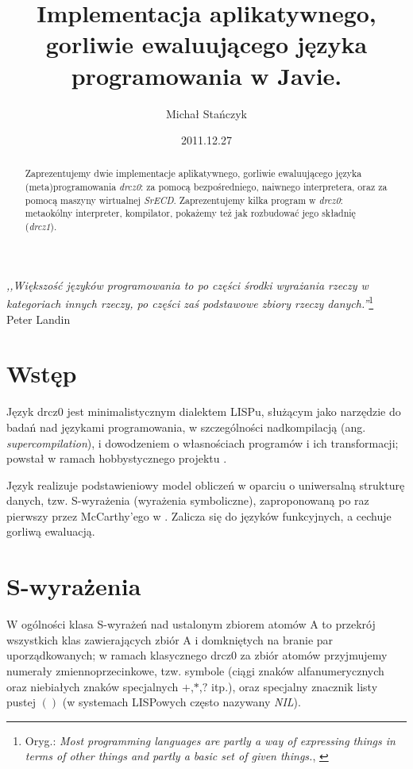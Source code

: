 \documentclass[a4paper]{article}
\title{Implementacja aplikatywnego, gorliwie ewaluującego języka programowania w Javie.}
\author{Michał Stańczyk}
\date{2011.12.27}
\begin{document}
\maketitle

\begin{abstract}
Zaprezentujemy dwie implementacje aplikatywnego, gorliwie ewaluującego języka (meta)programowania \emph{drcz0}:
za pomocą bezpośredniego, naiwnego interpretera, oraz za pomocą maszyny wirtualnej \emph{SrECD}. Zaprezentujemy kilka
program w \emph{drcz0}: metaokólny interpreter, kompilator, pokażemy też jak rozbudować jego składnię (\emph{drcz1}).
\end{abstract}

\begin{flushright}
 \emph{,,Większość języków programowania to po części środki wyrażania rzeczy w kategoriach innych
 rzeczy, po części zaś podstawowe zbiory rzeczy danych.''}\footnote{Oryg.: \emph{Most programming
languages are partly a way of expressing things in terms of other things and partly a basic set of
given things.}, \cite{Next700} }\\
Peter Landin
\end{flushright}


\section{Wstęp}

Język drcz0 jest minimalistycznym dialektem LISPu, służącym jako narzędzie do badań nad językami programowania,
w szczególności nadkompilacją (ang. \emph{supercompilation}), i dowodzeniem o własnościach programów i ich
transformacji; powstał w ramach hobbystycznego projektu \cite{drczlang}.

Język realizuje podstawieniowy model obliczeń w oparciu o uniwersalną strukturę danych, tzw. S-wyrażenia
(wyrażenia symboliczne), zaproponowaną po raz pierwszy przez McCarthy'ego w \cite{McCarthy1960}.
Zalicza się do języków funkcyjnych, a cechuje gorliwą ewaluacją.


\section{S-wyrażenia}

W ogólności klasa S-wyrażeń nad ustalonym zbiorem atomów A to przekrój wszystkich klas zawierających
zbiór A i domkniętych na branie par uporządkowanych; w ramach klasycznego drcz0 za zbiór atomów przyjmujemy
numerały zmiennoprzecinkowe, tzw. symbole (ciągi znaków alfanumerycznych oraz niebiałych znaków specjalnych
$+$,$*$,$?$ itp.), oraz specjalny znacznik listy pustej $()$ (w systemach LISPowych często nazywany \emph{NIL}).
\end{document}
